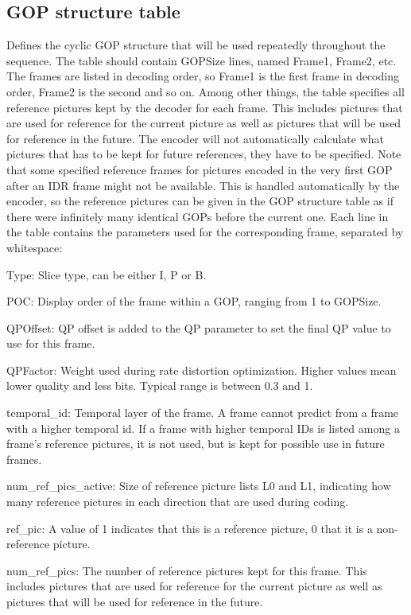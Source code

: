 \documentclass[a4paper,11pt]{jctvcdoc}
\begin{document}
\subsection{GOP structure table}
Defines the cyclic GOP structure that will be used repeatedly
throughout the sequence. The table should contain GOPSize lines,
named Frame1, Frame2, etc. The frames are listed in decoding
order, so Frame1 is the first frame in decoding order, Frame2 is
the second and so on. Among other things, the table specifies all
reference pictures kept by the decoder for each frame. This
includes pictures that are used for reference for the current
picture as well as pictures that will be used for reference in
the future. The encoder will not automatically calculate what
pictures that has to be kept for future references, they have to
be specified. Note that some specified reference frames for
pictures encoded in the very first GOP after an IDR frame might
not be available. This is handled automatically by the encoder,
so the reference pictures can be given in the GOP structure table
as if there were infinitely many identical GOPs before the
current one. Each line in the table contains the parameters used
for the corresponding frame, separated by whitespace:

Type: Slice type, can be either I, P or B.

POC: Display order of the frame within a GOP, ranging from 1 to
GOPSize.

QPOffset: QP offset is added to the QP parameter to set the final
QP value to use for this frame.

QPFactor: Weight used during rate distortion optimization. Higher
values mean lower quality and less bits. Typical range is between
0.3 and 1.

temporal_id: Temporal layer of the frame. A frame cannot predict
from a frame with a higher temporal id. If a frame with higher
temporal IDs is listed among a frame's reference pictures, it is
not used, but is kept for possible use in future frames.

num_ref_pics_active: Size of reference picture lists L0 and L1,
indicating how many reference pictures in each direction that are
used during coding.

ref_pic: A value of 1 indicates that this is a reference picture,
0 that it is a non-reference picture.

num_ref_pics: The number of reference pictures kept for this frame.
This includes pictures that are used for reference for the
current picture as well as pictures that will be used for
reference in the future.
\end{document}
